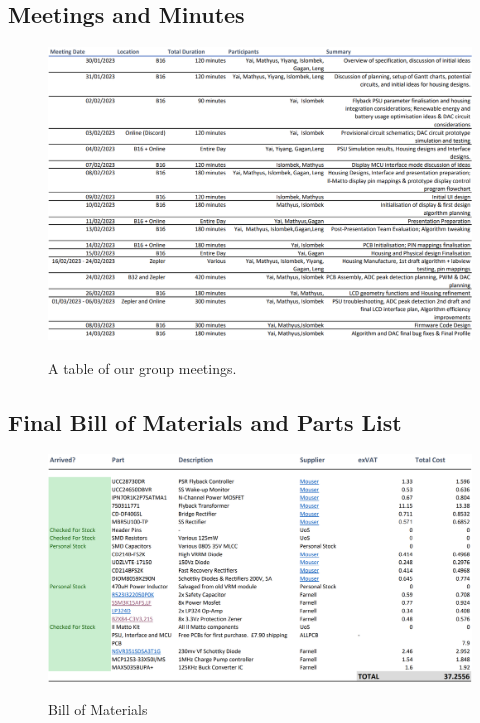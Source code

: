 \documentclass[9pt, technote, a4paper, nofonttune]{IEEEphot}
\begin{document}
\subsection{Meetings and Minutes}
    \begin{figure}[h]
        \centering
        \includegraphics[width=30pc]{D5/Meetings.png}
        \label{fig_env1}
        \caption{A table of our group meetings.}
    \end{figure}
\subsection{Final Bill of Materials and Parts List}
\begin{figure}[h]
        \centering
        \includegraphics[width=30pc]{D5/BOM.png}
        \label{fig_env1}
        \caption{Bill of Materials}
    \end{figure}

\newpage
\end{document}
